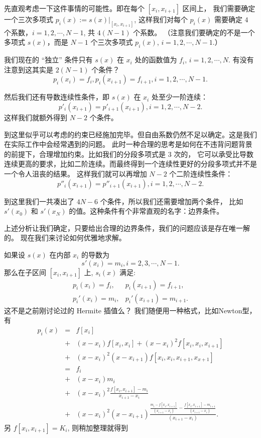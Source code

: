 \documentclass[a4paper]{ctexart}
\begin{document}
{先直观考虑一下这件事情的可能性。即在每个 $[x_i, x_{i + 1}]$ 区间上，
我们需要确定一个三次多项式 $p_i(x) := s(x)|_{[x_i, x_{i + 1}]}$, 
这样我们对每个 $p_i(x)$ 需要确定 $4$ 个系数，$i = 1, 2, \cdots, N - 1$, 
共 $4 (N - 1) $ 个系数。
（注意我们要确定的不是一个多项式 $s(x)$，而是 $N - 1$ 个三次多项式 $p_i(x)$,
$i = 1, 2, \cdots, N - 1$.）

我们现在的 ``独立'' 条件只有 $s(x)$ 在 $x_i$ 处的函数值为 $f_i$,
$i = 1, 2, \cdots, N$. 有没有注意到这其实是 $2 (N - 1) $ 个条件？
$$
p_i(x_i) = f_i, p_i(x_{i + 1}) = f_{i + 1}, i = 1, 2, \cdots, N - 1.     
$$

然后我们还有导数连续性条件，即 $s(x)$ 在 $x_i$ 处至少一阶连续：
$$
p'_i(x_{i + 1}) = p'_{i + 1}(x_{i + 1}), i = 1, 2, \cdots, N - 2.
$$
这样我们就额外得到 $N - 2$ 个条件。

到这里似乎可以考虑的约束已经施加完毕。但自由系数仍然不足以确定。这是我们在实际工作中会经常遇到的问题。
此时一种合理的思考是如何在不违背问题背景的前提下，合理增加约束。比如我们的分段多项式是 $3$ 次的，
它可以承受比导数连续更高的要求，比如二阶连续。而最终得到一个连续性更好的分段多项式并不是一个令人沮丧的结果。
这样我们就可以再增加 $N - 2$ 个二阶连续性条件：
$$
  p''_i(x_{i + 1}) = p''_{i + 1}(x_{i + 1}), i = 1, 2, \cdots, N - 2.
$$

到这里我们一共凑出了 $4 N - 6$ 个条件，所以我们还需要增加两个条件，
比如 $s'(x_0)$ 和 $s'(x_N)$ 的值。这种条件有个非常直观的名字：边界条件。

上述分析让我们确定，只要给出合理的边界条件，我们的问题应该是存在唯一解的。
现在我们来讨论如何优雅地求解。

如果设 $s(x)$ 在内部 $x_i$ 的导数为
$$
s'(x_i) = m_i, i = 2, 3, \cdots, N - 1.
$$
那么在子区间 $[x_{i}, x_{i + 1}]$ 上, $s_i(x)$ 满足:
$$
\begin{array}{ll}
p_i(x_i) = f_i, &p_i(x_{i + 1}) = f_{i + 1},\\
p_i'(x_i) = m_i, &p_i'(x_{i + 1}) = m_{i + 1}.
\end{array}
$$
这不是之前刚讨论过的 Hermite 插值么？ 我们随便用一种格式，比如Newton型，有 
$$
\begin{array}{rcl}
  p_i(x) &=& f[x_i]\\
  &+& (x - x_i)f[x_i, x_i] + (x - x_i)^2f[x_i, x_i, x_{i + 1}]\\
  &+& (x - x_i)^2(x - x_{i + 1})f[x_i, x_i, x_{i + 1}, x_{x + 1}] \\
  &=& f_i\\
  &+& (x - x_i)m_i\\
  &+& (x - x_i)^2 \frac{f[x_i, x_{i + 1}] - m_i}{x_{i + 1} - x_i}\\
  &+& (x - x_i)^2(x - x_{i + 1}) \frac{
  \frac{m_i - f[x_i, x_{i + 1}]}{(x_{i + 1} - x_i)}
  - \frac{f[x_i, x_{i + 1}] - m_{i + 1}}{(x_{i + 1} - x_i)}}{(x_{i + 1} - x_i)}.
\end{array}
$$
另 $f[x_i, x_{i + 1}] = K_i$, 则稍加整理就得到

}
\end{document}
